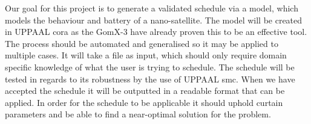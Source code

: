 Our goal for this project is to generate a validated schedule via a model, which models the behaviour and battery of a nano-satellite. The model will be created in UPPAAL \gls{cora} as the GomX-3\cite{gomx3} have already proven this to be an effective tool. The process should be automated and generalised so it may be applied to multiple cases. It will take a file as input, which should only require domain specific knowledge of what the user is trying to schedule. The schedule will be tested in regards to its robustness by the use of UPPAAL \gls{smc}. When we have accepted the schedule it will be outputted in a readable format that can be applied. In order for the schedule to be applicable it should uphold curtain parameters and be able to find a near-optimal solution for the problem.
\glsresetall




